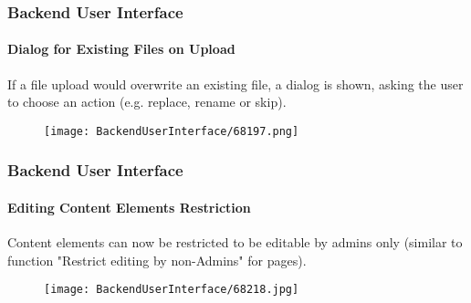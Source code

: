 \begin{frame}[fragile]
	\frametitle{Backend User Interface}
	\framesubtitle{Dialog for Existing Files on Upload}

	If a file upload would overwrite an existing file, a dialog is shown, asking the user
	to choose an action (e.g. replace, rename or skip).

	\begin{figure}
		\texttt{[image: BackendUserInterface/68197.png]}
	\end{figure}

\end{frame}


\begin{frame}[fragile]
	\frametitle{Backend User Interface}
	\framesubtitle{Editing Content Elements Restriction}

	Content elements can now be restricted to be editable by admins only
	(similar to function "Restrict editing by non-Admins" for pages).

	\begin{figure}
		\texttt{[image: BackendUserInterface/68218.jpg]}
	\end{figure}

\end{frame}

